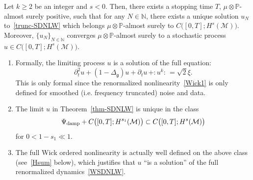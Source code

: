 \documentclass[AHL,Unicode,longabstracts,published]{cedram}
\newcommand{\damp}{\textup{damp}}
\newcommand{\Prob}{\mathbb{P}}
\newcommand{\N}{\mathbb{N}}
\newcommand{\M}{\mathcal{M}}
\newcommand{\g}{\mathfrak{g}}
\newcommand{\Dlg}{\Delta_{\g}}
\newcommand{\dt}{\partial_t}
\newcommand*{\romanenumi}{\renewcommand*{\theenumi}{\roman{enumi}}}
\begin{document}
\begin{theo}\label{thm-SDNLW}
Let $k\ge 2$ be an integer and $s < 0$. Then, there exists a stopping time $T$, $\mu\otimes\Prob$-almost surely positive, such that for any $N\in \N$, there exists a unique solution $u_N $ to~\eqref{trunc-SDNLW} which belongs $\mu\otimes\Prob$-almost surely to $C\big([0,T];H^{s}(\M)\big)$. Moreover, $\{u_N\}_{N\in\N}$ converges $\mu\otimes\Prob$-almost surely to a stochastic process $u\in C\big([0,T];H^{s}(\M)\big)$.
\end{theo}



\begin{rema}\label{REM:X1}\leavevmode
\begin{enumerate}\romanenumi
\item\label{rema1.3.i} Formally, the limiting process $u$ is a solution of the full equation:
\begin{equation}\label{WSDNLW}
\dt^2 u +(1-\Dlg)u +\dt u \,+ :\!u^k\!:\, = \sqrt{2}\xi.
\end{equation}
This is only formal since the renormalized nonlinearity~\eqref{Wick1} is only defined for smoothed (i.e. frequency truncated) noise and data.
%

\item\label{rema1.3.ii} The limit $u$ in Theorem~\ref{thm-SDNLW} is unique in the class
\begin{align*}
\Psi_{\damp} + C\big([0,T]; H^{s_1}(\M)\big)\subset C\big([0,T];H^{s}(\M)\big)
\end{align*}
for $0<1-s_1\ll 1$.


\item\label{rema1.3.iii} The full Wick ordered nonlinearity is actually well defined on the above class (see~\eqref{Hsum} below), which justifies that $u$ ``is a solution'' of the full renormalized dynamics~\eqref{WSDNLW}.
\end{enumerate}
\end{rema}
\end{document}
